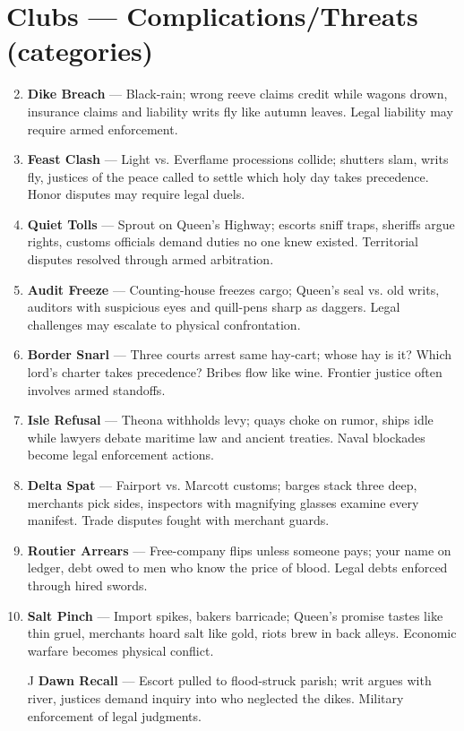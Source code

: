 \section*{Clubs --- Complications/Threats (categories)}
\label{sec:viterra-complications}
\begin{enumerate}
\setcounter{enumi}{1}
\item \textbf{Dike Breach} --- Black-rain; wrong reeve claims credit while wagons drown, insurance claims and liability writs fly like autumn leaves. Legal liability may require armed enforcement.
\item \textbf{Feast Clash} --- Light vs. Everflame processions collide; shutters slam, writs fly, justices of the peace called to settle which holy day takes precedence. Honor disputes may require legal duels.
\item \textbf{Quiet Tolls} --- Sprout on Queen's Highway; escorts sniff traps, sheriffs argue rights, customs officials demand duties no one knew existed. Territorial disputes resolved through armed arbitration.
\item \textbf{Audit Freeze} --- Counting-house freezes cargo; Queen's seal vs. old writs, auditors with suspicious eyes and quill-pens sharp as daggers. Legal challenges may escalate to physical confrontation.
\item \textbf{Border Snarl} --- Three courts arrest same hay-cart; whose hay is it? Which lord's charter takes precedence? Bribes flow like wine. Frontier justice often involves armed standoffs.
\item \textbf{Isle Refusal} --- Theona withholds levy; quays choke on rumor, ships idle while lawyers debate maritime law and ancient treaties. Naval blockades become legal enforcement actions.
\item \textbf{Delta Spat} --- Fairport vs. Marcott customs; barges stack three deep, merchants pick sides, inspectors with magnifying glasses examine every manifest. Trade disputes fought with merchant guards.
\item \textbf{Routier Arrears} --- Free-company flips unless someone pays; your name on ledger, debt owed to men who know the price of blood. Legal debts enforced through hired swords.
\item \textbf{Salt Pinch} --- Import spikes, bakers barricade; Queen's promise tastes like thin gruel, merchants hoard salt like gold, riots brew in back alleys. Economic warfare becomes physical conflict.
\item[J] \textbf{Dawn Recall} --- Escort pulled to flood-struck parish; writ argues with river, justices demand inquiry into who neglected the dikes. Military enforcement of legal judgments.

\end{enumerate}
